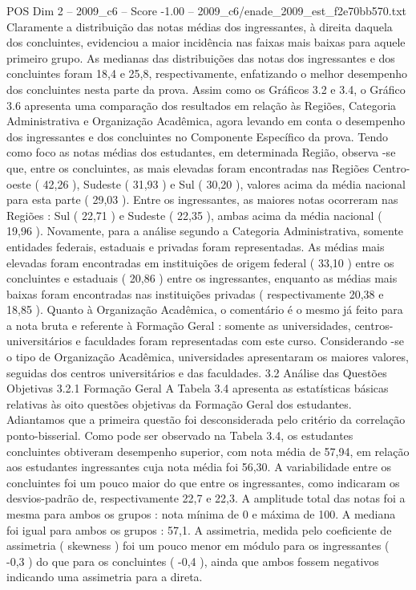 \begin{textsample}{POS Dim 2 – 2009\_c6 – Score -1.00 – 2009\_c6/enade\_2009\_est\_f2e70bb570.txt}
Claramente a distribuição das notas médias dos ingressantes, à direita daquela dos concluintes, evidenciou a maior incidência nas faixas mais baixas para aquele primeiro grupo.
As medianas das distribuições das notas dos ingressantes e dos concluintes foram 18,4 e 25,8, respectivamente, enfatizando o melhor desempenho dos concluintes nesta parte da prova.
Assim como os Gráficos 3.2 e 3.4, o Gráfico 3.6 apresenta uma comparação dos resultados em relação às Regiões, Categoria Administrativa e Organização Acadêmica, agora levando em conta o desempenho dos ingressantes e dos concluintes no Componente Específico da prova.
Tendo como foco as notas médias dos estudantes, em determinada Região, observa -se que, entre os concluintes, as mais elevadas foram encontradas nas Regiões Centro-oeste ( 42,26 ), Sudeste ( 31,93 ) e Sul ( 30,20 ), valores acima da média nacional para esta parte ( 29,03 ).
Entre os ingressantes, as maiores notas ocorreram nas Regiões : Sul ( 22,71 ) e Sudeste ( 22,35 ), ambas acima da média nacional ( 19,96 ).
Novamente, para a análise segundo a Categoria Administrativa, somente entidades federais, estaduais e privadas foram representadas.
As médias mais elevadas foram encontradas em instituições de origem federal ( 33,10 ) entre os concluintes e estaduais ( 20,86 ) entre os ingressantes, enquanto as médias mais baixas foram encontradas nas instituições privadas ( respectivamente 20,38 e 18,85 ).
Quanto à Organização Acadêmica, o comentário é o mesmo já feito para a nota bruta e referente à Formação Geral : somente as universidades, centros-universitários e faculdades foram representadas com este curso.
Considerando -se o tipo de Organização Acadêmica, universidades apresentaram os maiores valores, seguidas dos centros universitários e das faculdades. 3.2 Análise das Questões Objetivas 3.2.1 Formação Geral A Tabela 3.4 apresenta as estatísticas básicas relativas às oito questões objetivas da Formação Geral dos estudantes.
Adiantamos que a primeira questão foi desconsiderada pelo critério da correlação ponto-bisserial.
Como pode ser observado na Tabela 3.4, os estudantes concluintes obtiveram desempenho superior, com nota média de 57,94, em relação aos estudantes ingressantes cuja nota média foi 56,30.
A variabilidade entre os concluintes foi um pouco maior do que entre os ingressantes, como indicaram os desvios-padrão de, respectivamente 22,7 e 22,3.
A amplitude total das notas foi a mesma para ambos os grupos : nota mínima de 0 e máxima de 100.
A mediana foi igual para ambos os grupos : 57,1.
A assimetria, medida pelo coeficiente de assimetria ( skewness ) foi um pouco menor em módulo para os ingressantes ( -0,3 ) do que para os concluintes ( -0,4 ), ainda que ambos fossem negativos indicando uma assimetria para a direta.

\end{textsample}
